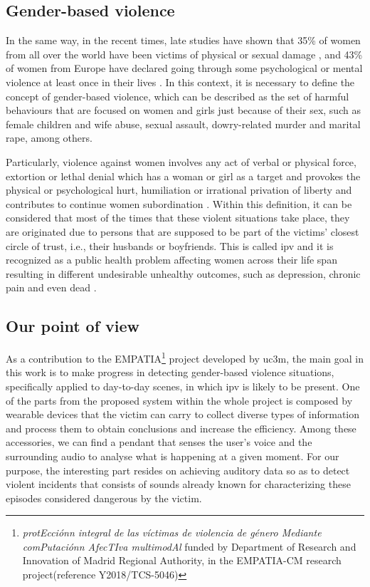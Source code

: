 \subsection{Gender-based violence}
	
	 In the same way, in the recent times, late studies have shown that 35\% of women from all over the world have been victims of physical or sexual damage \cite{WHO2013}, and 43\% of women from Europe have declared going through some psychological or mental violence at least once in their lives \cite{EuropeanUnionAgencyforFundamentalRights2014}. In this context, it is necessary to define the concept of gender-based violence, which can be described as the set of harmful behaviours that are focused on women and girls just because of their sex, such as female children and wife abuse, sexual assault, dowry-related murder and marital rape, among others. 
	 
	 Particularly, violence against women involves any act of verbal or physical force, extortion or lethal denial which has a woman or girl as a target and provokes the physical or psychological hurt, humiliation or irrational privation of liberty and contributes to continue women subordination \cite{Heise1999}. Within this definition, it can be considered that most of the times that these violent situations take place, they are originated due to persons that are supposed to be part of the victims' closest circle of trust, i.e., their husbands or boyfriends. This is called \acrfull{ipv} and it is recognized as a public health problem affecting women across their life span resulting in different undesirable unhealthy outcomes, such as depression, chronic pain and even dead \cite{Beyer2015}.
	
\subsection{Our point of view}
\label{subsection:our-point-of-view}

	As a contribution to the EMPATIA\footnote{\textit{protEcciónn integral de las víctimas de violencia de género Mediante comPutaciónn AfecTIva multimodAl} funded by Department  of  Research  and Innovation of Madrid Regional Authority, in the EMPATIA-CM research project(reference  Y2018/TCS-5046)} project developed by \acrlong{uc3m}, the main goal in this work is to make progress in detecting gender-based violence situations, specifically applied to day-to-day scenes, in which \acrshort{ipv} is likely to be present. One of the parts from the proposed system within the whole project is composed by wearable devices that the victim can carry to collect diverse types of information and process them to obtain conclusions and increase the efficiency. Among these accessories, we can find a pendant that senses the user's voice and the surrounding audio to analyse what is happening at a given moment. For our purpose, the interesting part resides on achieving auditory data so as to detect violent incidents that consists of sounds already known for characterizing these episodes considered dangerous by the victim.
	
